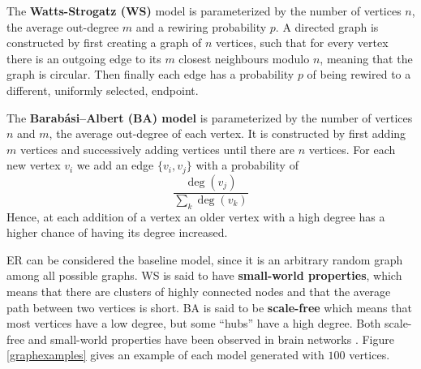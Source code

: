 \begin{definition}
The \textbf{Watts-Strogatz (WS)} model is parameterized by the number of vertices $n$, the average out-degree $m$ and a rewiring probability $p$. A directed graph is constructed by first creating a graph of $n$ vertices, such that for every vertex there is an outgoing edge to its $m$ closest neighbours modulo $n$, meaning that the graph is circular. Then finally each edge has a probability $p$ of being rewired to a different, uniformly selected, endpoint.
\end{definition}

\begin{definition}
  The \textbf{Barabási–Albert (BA) model} is parameterized by the number of vertices $n$ and $m$, the average out-degree of each vertex. It is constructed by first adding $m$ vertices and successively adding vertices until there are $n$ vertices. For each new vertex $v_{i}$ we add an edge $\{v_{i},v_{j}\}$  with a probability of
  \[
    \frac{\deg(v_{j})}{\sum_{k} \deg(v_{k})}
  \]
  Hence, at each addition of a vertex an older vertex with a high degree has a higher chance of having its degree increased.
\end{definition}
ER can be considered the baseline model, since it is an arbitrary random graph among all possible graphs. WS is said to have \textbf{small-world properties}, which means that there are clusters of highly connected nodes and that the average path between two vertices is short. BA is said to be \textbf{scale-free} which means that most vertices have a low degree, but some ``hubs'' have a high degree. Both scale-free and small-world properties have been observed in brain networks \cite{SPORNS2004418}. Figure \ref{graphexamples} gives an example of each model generated with $100$ vertices.

